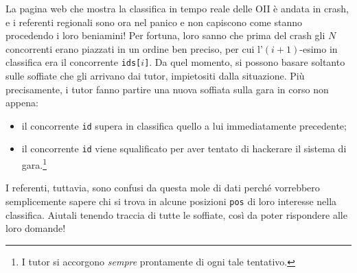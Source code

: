 \usepackage{xcolor}
\usepackage{afterpage}
\usepackage{pifont,mdframed}
\usepackage[bottom]{footmisc}



\newcommand{\inputfile}{\texttt{stdin}}
\newcommand{\outputfile}{\texttt{stdout}}

\newenvironment{warning}
  {\par\begin{mdframed}[linewidth=2pt,linecolor=gray]%
    \begin{list}{}{\leftmargin=1cm
                   \labelwidth=\leftmargin}\item[\Large\ding{43}]}
  {\end{list}\end{mdframed}\par}



	La pagina web che mostra la classifica in tempo reale delle OII è andata in crash, e i referenti regionali sono ora nel panico e non capiscono come stanno procedendo i loro beniamini! Per fortuna, loro sanno che prima del crash gli $N$ concorrenti erano piazzati in un ordine ben preciso, per cui l'$(i+1)$-esimo in classifica era il concorrente \texttt{ids[$i$]}. Da quel momento, si possono basare soltanto sulle soffiate che gli arrivano dai tutor, impietositi dalla situazione. Più precisamente, i tutor fanno partire una nuova soffiata sulla gara in corso non appena:
	\begin{itemize}
		\item il concorrente \texttt{id} supera in classifica quello a lui immediatamente precedente;
		\item il concorrente \texttt{id} viene squalificato per aver tentato di hackerare il sistema di gara.\footnote{I tutor si accorgono \emph{sempre} prontamente di ogni tale tentativo.}
	\end{itemize}
	I referenti, tuttavia, sono confusi da questa mole di dati perché vorrebbero semplicemente sapere chi si trova in alcune posizioni \texttt{pos} di loro interesse nella classifica. Aiutali tenendo traccia di tutte le soffiate, così da poter rispondere alle loro domande!


